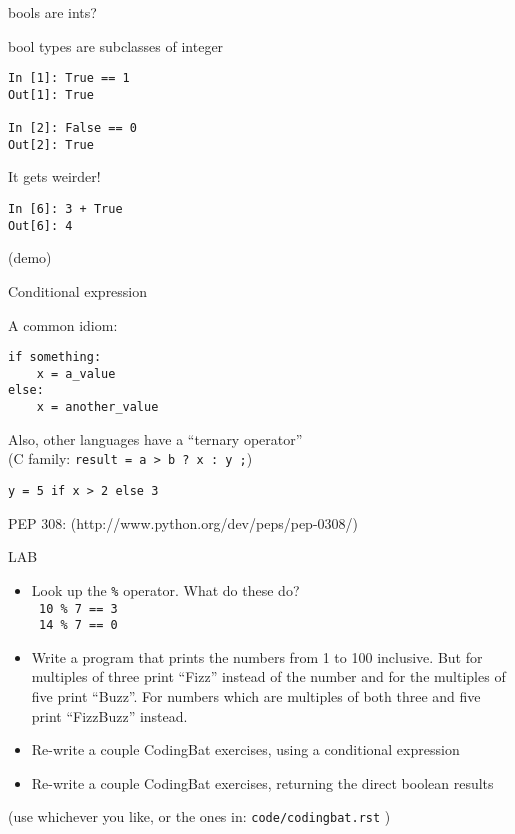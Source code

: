 \documentclass{beamer}
\begin{document}
\begin{frame}[fragile]{bools are ints?}

{\Large bool types are subclasses of integer}

\begin{verbatim}
In [1]: True == 1
Out[1]: True

In [2]: False == 0
Out[2]: True  
\end{verbatim}

{\Large It gets weirder! }

\begin{verbatim}
In [6]: 3 + True
Out[6]: 4
\end{verbatim}

(demo)

\end{frame}

\begin{frame}[fragile]{Conditional expression}

{\large A common idiom:}
\begin{verbatim}
if something:
    x = a_value
else:
    x = another_value
\end{verbatim}
\vfill
{\large Also, other languages have a ``ternary operator''}\\
\hspace{0.2in}(C family: \verb|result = a > b ? x : y ;|)

\vfill
{ \Large \verb|y = 5 if x > 2 else 3| }

\vfill
{\large PEP 308:}
(http://www.python.org/dev/peps/pep-0308/)

\end{frame}



\begin{frame}[fragile]{LAB}

\begin{itemize}
  \item Look up the \verb+%+ operator. What do these do?\\
    \verb| 10 % 7 == 3 | \\
    \verb| 14 % 7 == 0 |
  \item  Write a program that prints the numbers from 1 to 100 inclusive.
But for multiples of three print ``Fizz'' instead of the number and for the
multiples of five print ``Buzz''. For numbers which are multiples of both three
and five print ``FizzBuzz'' instead.

  \item Re-write a couple CodingBat exercises, using a conditional expression


  \item Re-write a couple CodingBat exercises, returning the direct boolean results\\
\end{itemize}

(use whichever you like, or the ones in: \verb|code/codingbat.rst| )

\end{frame}
\end{document}
